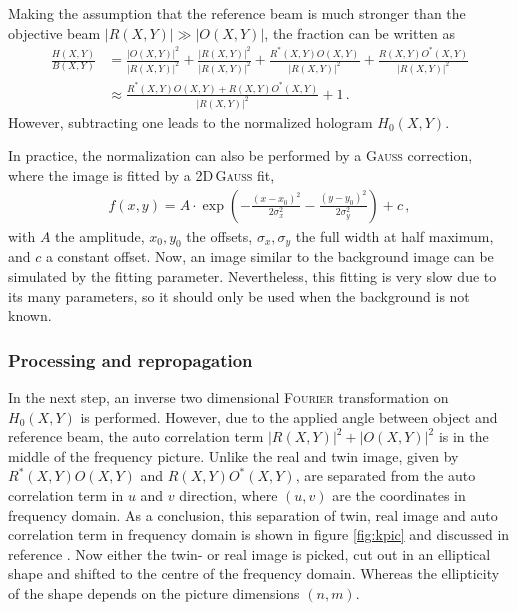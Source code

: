 \documentclass{article}
\begin{document}
Making the assumption that the reference beam is much stronger than the objective beam $\left|R(X,Y)\right|\gg\left|O(X,Y)\right|$, the fraction can be written as
\begin{align}
    \frac{H(X,Y)}{B(X,Y)} &= \frac{\left|O(X,Y)\right|^2}{|R(X,Y)|^2} + \frac{\left|R(X,Y)\right|^2}{|R(X,Y)|^2} + \frac{R^*(X,Y)O(X,Y)}{|R(X,Y)|^2} + \frac{R(X,Y)O^*(X,Y)}{|R(X,Y)|^2}
    \nonumber\\ &\approx 
    \frac{R^*(X,Y)O(X,Y)+R(X,Y)O^*(X,Y)}{|R(X,Y)|^2} + 1\,.
\end{align}
However, subtracting one leads to the normalized hologram $H_0(X,Y)$.

In practice, the normalization can also be performed by a \textsc{Gauss} correction, where the image is fitted by a 2D\,\textsc{Gauss} fit, 
\begin{align}
    f(x,y)=A\cdot\exp\left(-\frac{(x-x_0)^2}{2\sigma_x^2}-\frac{(y-y_0)^2}{2\sigma_y^2}\right)+c\,,
\end{align}
with $A$ the amplitude, $x_0, y_0$ the offsets, $\sigma_x, \sigma_y$ the full width at half maximum, and $c$ a constant offset. Now, an image similar to the background image can be simulated by the fitting parameter. Nevertheless, this fitting is very slow due to its many parameters, so it should only be used when the background is not known.

\subsubsection{Processing and repropagation}
In the next step, an inverse two dimensional \textsc{Fourier} transformation on $H_0(X,Y)$ is performed. However, due to the applied angle between object and reference beam, the auto correlation term $\left|R(X,Y)\right|^2+\left|O(X,Y)\right|^2$ is in the middle of the frequency picture. Unlike the real and twin image, given by $R^*(X,Y)O(X,Y)$ and $R(X,Y)O^*(X,Y)$, are separated from the auto correlation term in $u$ and $v$ direction, where $(u,v)$ are the coordinates in frequency domain. As a conclusion, this separation of twin, real image and auto correlation term in frequency domain is shown in figure \ref{fig:kpic} and discussed in reference \cite{Verrier:11}.
Now either the twin- or real image is picked, cut out in an elliptical shape and shifted to the centre of the frequency domain. Whereas the ellipticity of the shape depends on the picture dimensions $(n,m)$.
\end{document}
